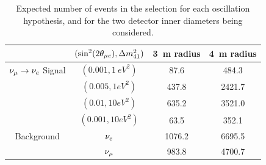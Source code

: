 
\begin{table}
\begin{small}
 \caption{Expected number of events in the \nue selection for each oscillation hypothesis, and for the two detector inner diameters being considered.}
 \begin{center}
  \begin{tabular}{ c c c c }
\hline
\hline
& $(\textrm{sin}^2(2\theta_{\mu e}), \Delta m^{2}_{41})$  & 3~m radius & 4~m radius \\
\hline
$\nu_\mu \rightarrow \nu_e$ Signal &$(0.001,1~eV^2)$      &  87.6    &   484.3      \\
                                &$(0.005,1eV^2)$      &  437.8   &   2421.7     \\
				&$(0.01,10eV^2)$      &  635.2   &   3521.0     \\
				&$(0.001,10eV^2)$     &  63.5    &   352.1      \\
\hline
Background                      &$\nu_e$               &  1076.2  &   6695.5     \\
                                &$\nu_\mu$              &  983.8   &   4700.7     \\
\hline
\hline
  \end{tabular}
 \end{center}
\label{tab:steriles_events}
\end{small}
\end{table}


